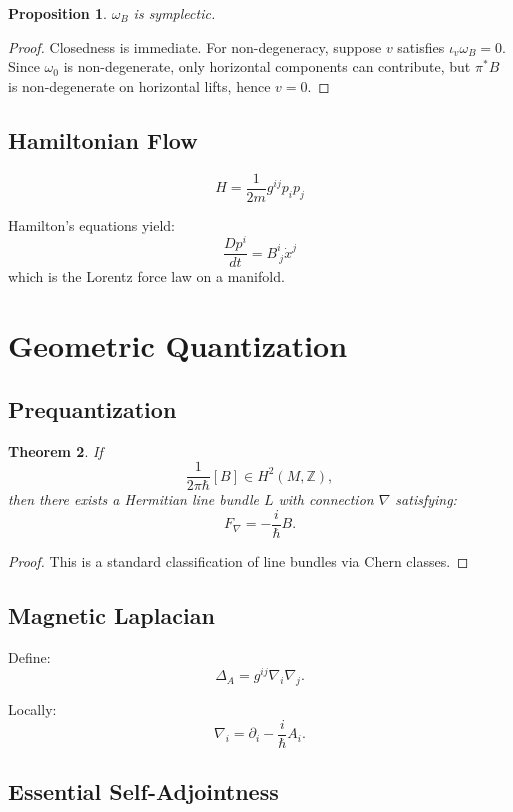\documentclass[11pt]{article}
\newtheorem{theorem}{Theorem}[section]
\newtheorem{proposition}[theorem]{Proposition}
\begin{document}
\begin{proposition}
$\omega_B$ is symplectic.
\end{proposition}

\begin{proof}
Closedness is immediate. For non-degeneracy, suppose $v$ satisfies $\iota_v \omega_B = 0$. Since $\omega_0$ is non-degenerate, only horizontal components can contribute, but $\pi^*B$ is non-degenerate on horizontal lifts, hence $v=0$.
\end{proof}

\subsection{Hamiltonian Flow}

\[
H = \frac{1}{2m} g^{ij} p_i p_j
\]

Hamilton's equations yield:
\[
\frac{Dp^i}{dt} = B^i_{\ j} \dot{x}^j
\]
which is the Lorentz force law on a manifold.

\section{Geometric Quantization}

\subsection{Prequantization}

\begin{theorem}
If
\[
\frac{1}{2\pi\hbar}[B] \in H^2(M,\mathbb{Z}),
\]
then there exists a Hermitian line bundle $L$ with connection $\nabla$ satisfying:
\[
F_\nabla = -\frac{i}{\hbar} B.
\]
\end{theorem}

\begin{proof}
This is a standard classification of line bundles via Chern classes.
\end{proof}

\subsection{Magnetic Laplacian}

Define:
\[
\Delta_A = g^{ij}\nabla_i \nabla_j.
\]

Locally:
\[
\nabla_i = \partial_i - \frac{i}{\hbar}A_i.
\]

\subsection{Essential Self-Adjointness}
\end{document}
